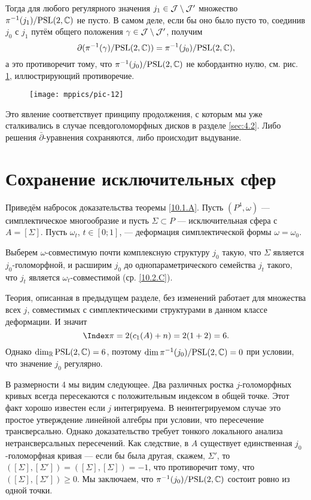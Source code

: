 Тогда для любого регулярного значения $j_1 \in \mathcal{J} \setminus \mathcal{J}'$ множество $\pi^{-1} (j_1)/\mathrm{PSL}(2, \mathbb{C})$ не пусто.
В самом деле, если бы оно было пусто то, соединив $j_0$ с $j_1$ путём общего положения $\gamma \in \mathcal{J} \setminus\mathcal{J}'$, получим
\[\partial(\pi^{-1}(\gamma)/\mathrm{PSL}(2,\mathbb{C}))
=
\pi^{-1}(j_0)/\mathrm{PSL}(2,\mathbb{C}),
\]
а это противоречит тому, что $\pi^{-1} (j_0)/\mathrm{PSL}(2, \mathbb{C})$ не кобордантно нулю, см. рис. \ref{pic-12}, иллюстрирующий противоречие.

\begin{figure}[ht!]
\vskip0mm
\centering
\texttt{[image: mppics/pic-12]}
\caption{}\label{pic-12}
\vskip0mm
\end{figure}

Это явление соответствует принципу продолжения, с которым мы уже сталкивались в
случае псевдоголоморфных дисков в разделе \ref{sec:4.2}. 
Либо решения $\bar\partial$-уравнения сохраняются, либо происходит выдувание.

\section{Сохранение исключительных сфер}

Приведём набросок доказательства теоремы \ref{10.1.A}.
Пусть $(P^4, \omega)$ — симплектическое многообразие и пусть $\Sigma \subset P$ — исключительная сфера с $A = [\Sigma]$.
Пусть $\omega_t$, $t \in [0;1]$, — деформация симплектической формы $\omega = \omega_0$.

Выберем $\omega$-совместимую почти комплексную структуру $j_0$ такую, что $\Sigma$ является $j_0$-голоморфной, и расширим $j_0$ до однопараметрического семейства $j_t$ такого, что $j_t$ является $\omega_t$-совместимой (ср. \ref{10.2.C}).

Теория, описанная в предыдущем разделе, без изменений работает для
множества всех $j$, совместимых с симплектическими структурами в
данном классе деформации. 
И значит
\[\Index\pi = 2(c_1 (A) + n) = 2(1 + 2) = 6.\]
Однако $\dim_{\mathbb{R}}\mathrm{PSL}(2, \mathbb{C}) = 6$, поэтому $\dim \pi^{-1}
(j_0)/\mathrm{PSL}(2, \mathbb{C}) = 0$ при условии, что значение $j_0$ регулярно. 

В размерности 4 мы видим следующее.
Два различных ростка $j$-голоморфных кривых всегда пересекаются с
положительным индексом в общей точке. 
Этот факт хорошо известен если $j$ интегрируема.
В неинтегрируемом случае это простое утверждение линейной алгебры при
условии, что пересечение трансверсально. 
Однако доказательство требует тонкого локального анализа
нетрансверсальных пересечений. 
Как следствие, в $A$ существует единственная $j_0$-голоморфная кривая
— если бы была другая, скажем, $\Sigma'$, то $([\Sigma], [\Sigma'])
= ([\Sigma], [\Sigma]) = -1$, что противоречит тому, что $([\Sigma],
[\Sigma']) \ge 0$. 
Мы заключаем, что $\pi^{-1} (j_0)/\mathrm{PSL}(2, \mathbb{C})$ состоит ровно из одной
точки. 

